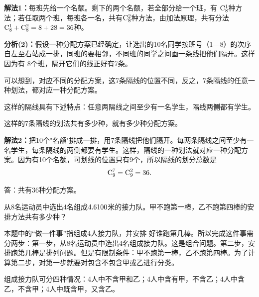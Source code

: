 \textbf{解法1：}每班先给一个名额。剩下的两个名额，若全部分给一个班，有 $\comb{8}{1} $种方法；若任取两个班，每班各一名，共有$ \comb{8}{2} $种方法，由加法原理，共有分法$\comb{8}{1}+\comb{8}{2}=8+28=36$种。

\textbf{分析(2)：}假设一种分配方案已经确定，让选出的10名同学按班号（1—8）的次序自左至右站成一排，同班的要相邻，不同班的同学之间画一条线把他们隔开。这样因为有 8个班，隔开它们的线正好有7条。

可以想到，对应不同的分配方案，这7条隔线的位置不同，反之，7条隔线的任意一种划法，都对应一种分配方案。

这样的隔线具有下述特点：任意两隔线之间至少有一名学生，隔线两侧都有学生。

这样的7条隔线的划法共有多少种，就有多少种分配方案。

\textbf{解法2：}把10个"名额"排成一排，用7条隔线把他们隔开。每两条隔线之间至少有一名学生，每条隔线的两侧都要有学生。这样，隔线的一种划法就对应一种分配方案。因为有10个名额，可划线的位置只有9个，所以隔线的划分总数是
\[
\comb{9}{7}=\comb{9}{2}=36.\]

答：共有36种分配方案。

\begin{example}
    从8名运动员中选出4名组成$ 4\x  100 $米的接力队。甲不跑第一棒，乙不跑第四棒的安排方法共有多少种？
\end{example}

\begin{analyze}
本题中的“做一件事”指组成4人接力队，并安排
好谁跑第几棒。所以完成这件事需分两步：第一步，从8名运动员中选出4名组成接力队。这是组合问题。第二步，安排跑第几棒是排列问题。但是有限制条件：甲不跑第一棒，乙不跑第四棒。为了计算第二步，对第一步就要对包含不包含甲或乙进行分类。

组成接力队可分四种情况：4人中不含甲和乙；4人中含有甲，不含乙；4人中含乙，不含甲；4人中既含甲，又含乙。    
\end{analyze}

